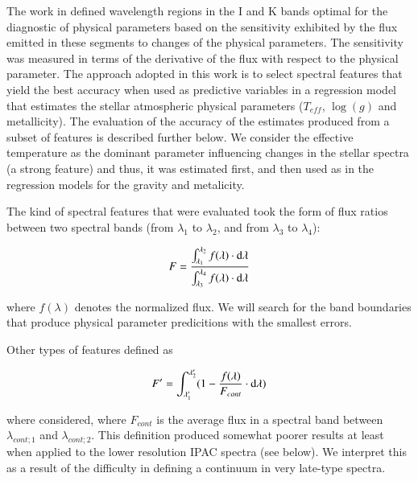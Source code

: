 {{The work in \cite{2013A&A...549A.129C} defined wavelength regions in
the I and K bands optimal for the diagnostic of physical parameters
based on the sensitivity exhibited by the flux emitted in these
segments to changes of the physical parameters. The sensitivity was
measured in terms of the derivative of the flux with respect to the
physical parameter. The approach adopted in this work is to select
spectral features that yield the best accuracy when used as predictive
variables in a regression model that estimates the stellar atmospheric
physical parameters ($T_{eff}$, $\log(g)$ and metallicity). The
evaluation of the accuracy of the estimates produced from a subset of
features is described further below. We consider the effective
temperature as the dominant parameter influencing changes in the
stellar spectra (a strong feature) and thus, it was estimated first,
and then used as in the regression models for the gravity and
metalicity.}

The kind of spectral features that were evaluated took the form of
flux ratios between two spectral bands (from $\lambda_1$ to
$\lambda_2$, and from $\lambda_3$ to $\lambda_4$):

\begin{equation}\label{eq:feature}
  F = \frac{ \int_{\lambda_{1}}^{\lambda_{2}}f(\lambda) \cdot {\rm d}{\lambda}}
               {\int_{\lambda_{3}}^{\lambda_{4}} f(\lambda) \cdot {\rm d}{\lambda}} 
\end{equation}

where $f(\lambda)$ denotes the normalized flux. We will search for the
band boundaries that produce physical parameter predicitions with the
smallest errors.

Other types of features defined as

\begin{equation}\label{eq:feature2}
  F' = \int_{\lambda'_{1}}^{\lambda'_{2}} (1-\frac{f(\lambda)}{F_{cont}} \cdot {\rm d}{\lambda})
\end{equation}

where considered, where $F_{cont}$ is the average flux in a spectral
band between $\lambda_{cont;1}$ and $\lambda_{cont;2}$. This
definition produced somewhat poorer results at least when applied to
the lower resolution IPAC spectra (see below). We interpret this as a
result of the difficulty in defining a continuum in very late-type
spectra. 


}

